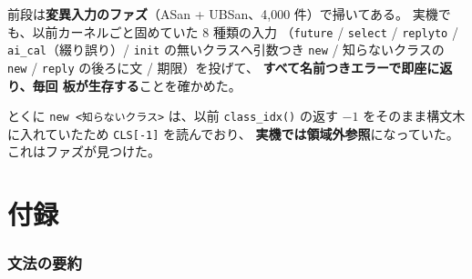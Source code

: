 \documentclass[11pt,a4paper]{ltjsarticle}
\begin{document}
前段は\textbf{変異入力のファズ}（ASan + UBSan、4{,}000 件）で掃いてある。
実機でも、以前カーネルごと固めていた 8 種類の入力
（\texttt{future} / \texttt{select} / \texttt{replyto} /
\texttt{ai\_cal}（綴り誤り）/ \texttt{init} の無いクラスへ引数つき \texttt{new} /
知らないクラスの \texttt{new} / \texttt{reply} の後ろに文 / 期限）を投げて、
\textbf{すべて名前つきエラーで即座に返り、毎回 板が生存する}ことを確かめた。

とくに \texttt{new <知らないクラス>} は、以前 \texttt{class\_idx()} の返す
$-1$ をそのまま構文木に入れていたため \texttt{CLS[-1]} を読んでおり、
\textbf{実機では領域外参照}になっていた。これはファズが見つけた。


\part{付録}
\label{part:appendix}

\section{文法の要約}
\end{document}
